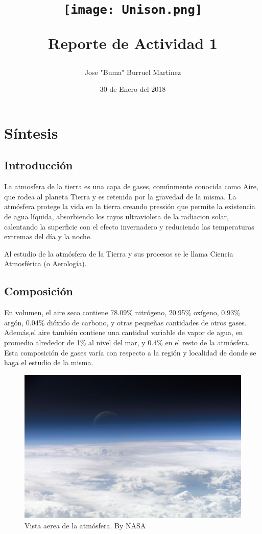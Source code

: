 \documentclass{article}
\title{
        \begin{center}
        \texttt{[image: Unison.png]}
        \end{center}
        \newline
       Reporte de Actividad 1}
\author{Jose "Buma" Burruel Martinez}
\date{30 de Enero del 2018}
\begin{document}

\newpage
\section{Síntesis}

\subsection{Introducción}
La atmosfera de la tierra es una capa de gases, comúnmente conocida como Aire, que rodea al planeta Tierra y es retenida por la gravedad de la misma. La atmósfera protege la vida en la tierra creando pressión que permite la existencia de agua líquida, absorbiendo los rayos ultravioleta de la radiacion solar, calentando la superficie con el efecto invernadero y reduciendo las temperaturas extremas del día y la noche.


Al estudio de la atmósfera de la Tierra y sus procesos se le llama Ciencia Atmosférica (o Aerología).

\subsection{Composición}
En volumen, el aire seco contiene 78.09\% nitrógeno, 20.95\% oxígeno, 0.93\% argón, 0.04\% dióxido de carbono, y otras pequeñas cantidades de otros gases. Además,el aire también contiene una cantidad variable de vapor de agua, en promedio alrededor de 1\% al nivel del mar, y 0.4\% en el resto de la atmósfera. Esta composición de gases  varía con respecto a la región y localidad de donde se haga el estudio de la misma.

\begin{figure}
    \includegraphics[width=\linewidth]{Top_of_Atmosphere.jpg}
    \caption{Vista aerea de la atmósfera. By NASA}
    \label{fig:foto1}
\end{figure}
    
\end{document}
